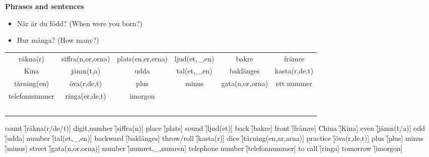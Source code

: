
\begin{flushleft}
    \textbf{Phrases and sentences}
    \begin{itemize}
        \item När är du född? (When were you born?)
        \item Hur många? (How many?)
    \end{itemize}
\end{flushleft}

\begin{center}
    \begin{tabular}{|c c c c c c|}
        \hline
        räkna(r) & siffra(n,or,orna) & plats(en,er,erna) & ljud(et,\_,en) & bakre & främre \\
        Kina & jämn(t,a) & udda & tal(et,\_,en) & baklänges & kasta(r,de,t) \\
        tärning(en) & öva(r,de,t) & plus & minus & gata(n,or,orna) & ett nummer \\
        telefonnummer & ringa(er,de,t) & imorgon &  &  &  \\
         &  &  &  &  &  \\
         &  &  &  &  &  \\
         &  &  &  &  &  \\
         &  &  &  &  &  \\
         &  &  &  &  &  \\
        \hline
    \end{tabular}
\end{center}

\begin{questions}
    \begin{multicols}{2}
        \raggedcolumns
        \question count \f[räkna(r/de/t)]
        \question digit,number \f[siffra(n)]
        \question place \f[plats]
        \question sound \f[ljud(et)]
        \question back \f[bakre]
        \question front \f[främre]
        \question China \f[Kina]
        \question even \f[jämn(t/a)]
        \question odd  \f[udda]
        \question number \f[tal(et,\_,en)]
        \question backward \f[baklänges]
        \question throw/roll \f[kasta(r)]
        \question dice \f[tärning(en,ar,arna)]
        \question practice \f[öva(r,de,t)]
        \question plus \f[plus]
        \question minus \f[minus]
        \question street \f[gata(n,or,orna)]
        \question number \f[numret,\_,numren]
        \question telephone number \f[telefonnummer]
        \question to call \f[ringa]
        \question tomorrow \f[imorgon]
    \end{multicols}
\end{questions}
